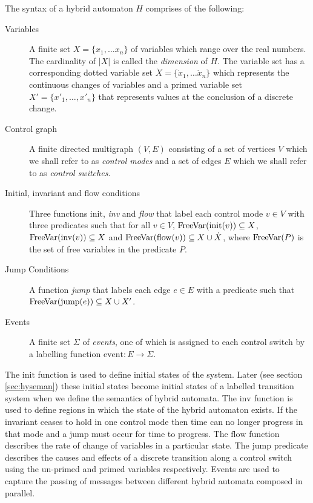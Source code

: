 \medskip
\begin{mydef}
The syntax of a hybrid automaton $H$ comprises of the following:
\begin{description}
\item[Variables] A finite set $X = \{x_1, \ldots x_n \}$ of variables which range over the real numbers. The cardinality of $|X|$ is called the \emph{dimension} of $H$. The variable set has a corresponding dotted variable set $\dot{X} = \{\dot{x}_1, \ldots \dot{x}_n \}$ which represents the continuous changes of variables and a primed variable set $X' = \{x'_1, \ldots , x'_n \}$ that represents  values at the conclusion of a discrete change.

\item[Control graph] A finite directed multigraph $(V,E)$ consisting of a set of vertices $V$ which we shall refer to as \emph{control modes} and a set of edges $E$ which we shall refer to as \emph{control switches}.

\item[Initial, invariant and flow conditions] Three functions $\mathrm{init}$, \emph{inv} and \emph{flow} that label each control mode $v \in V$ with three predicates such that for all $v \in V$, $\mathrm{FreeVar}(\mathrm{init}(v)) \subseteq X$, $\mathrm{FreeVar}(\mathrm{inv}(v)) \subseteq X$ and $\mathrm{FreeVar}(\mathrm{flow}(v)) \subseteq X \cup \dot{X}$, where $\mathrm{FreeVar}(P)$ is the set of free variables in the predicate $P$.


\item[Jump Conditions] A function \emph{jump} that labels each edge $e \in E$ with a predicate such that $\mathrm{FreeVar}(\mathrm{jump}(e)) \subseteq X \cup X' $.

\item[Events] A finite set $\Sigma$ of \emph{events}, one of which is assigned to  each control switch by a labelling function $\mathrm{event}: E \to \Sigma$.

\end{description}

\end{mydef}
\medskip
 
The $\mathrm{init}$ function is used to define initial states of the system. Later (see section \ref{sec:hyseman}) these initial states become initial states of a labelled transition system when we define the semantics of hybrid automata. The $\mathrm{inv}$ function is used to define regions in which the state of the hybrid automaton exists. If the invariant ceases to hold in one control mode then time can no longer progress in that mode and a jump must occur for time to progress. The $\mathrm{flow}$ function describes the rate of change of variables in a particular state. The $\mathrm{jump}$ predicate describes the causes and effects of a discrete transition along a control switch using the un-primed and primed variables respectively.  Events are used to capture the passing of messages between different hybrid automata composed in parallel.

